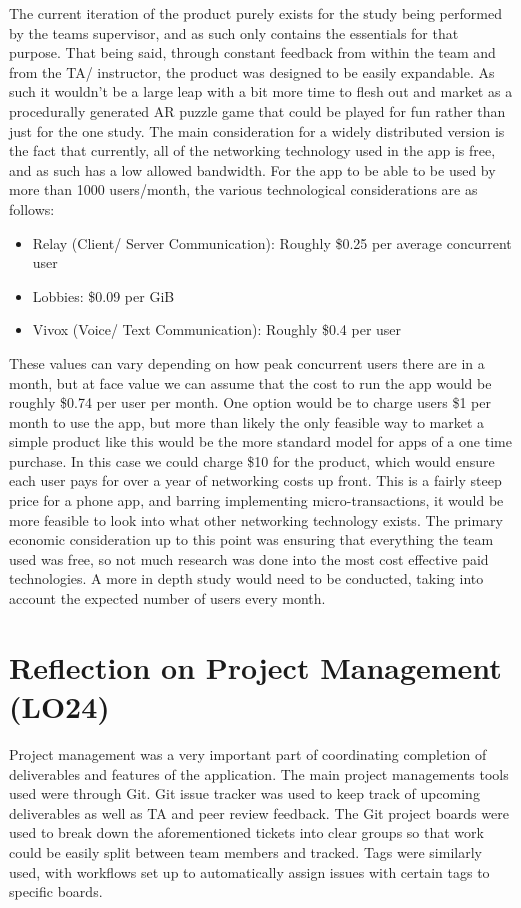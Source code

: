 \documentclass{article}
\begin{document}
The current iteration of the product purely exists for the study being performed by the teams supervisor, and as such only contains the essentials for that purpose. That being said, through constant feedback from within the team and from the TA/ instructor, the product was designed to be easily expandable. As such it wouldn't be a large leap with a bit more time to flesh out and market as a procedurally generated AR puzzle game that could be played for fun rather than just for the one study. The main consideration for a widely distributed version is the fact that currently, all of the networking technology used in the app is free, and as such has a low allowed bandwidth. For the app to be able to be used by more than 1000 users/month, the various technological considerations are as follows:
\begin{itemize}
    \item Relay (Client/ Server Communication): Roughly \$0.25 per average concurrent user
    \item Lobbies: \$0.09 per GiB
    \item Vivox (Voice/ Text Communication): Roughly \$0.4 per user
\end{itemize}
These values can vary depending on how peak concurrent users there are in a month, but at face value we can assume that the cost to run the app would be roughly \$0.74 per user per month. One option would be to charge users \$1 per month to use the app, but more than likely the only feasible way to market a simple product like this would be the more standard model for apps of a one time purchase. In this case we could charge \$10 for the product, which would ensure each user pays for over a year of networking costs up front. This is a fairly steep price for a phone app, and barring implementing micro-transactions, it would be more feasible to look into what other networking technology exists. The primary economic consideration up to this point was ensuring that everything the team used was free, so not much research was done into the most cost effective paid technologies. A more in depth study would need to be conducted, taking into account the expected number of users every month. 

\section{Reflection on Project Management (LO24)}
Project management was a very important part of coordinating completion of deliverables and features of the application. The main project managements tools used were through Git. Git issue tracker was used to keep track of upcoming deliverables as well as TA and peer review feedback. The Git project boards were used to break down the aforementioned tickets into clear groups so that work could be easily split between team members and tracked. Tags were similarly used, with workflows set up to automatically assign issues with certain tags to specific boards.
\end{document}
